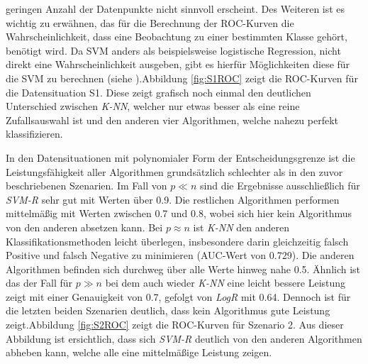 \documentclass[
]{article}
\begin{document}
geringen Anzahl der Datenpunkte nicht sinnvoll erscheint. Des Weiteren
ist es wichtig zu erwähnen, das für die Berechnung der ROC-Kurven die
Wahrscheinlichkeit, dass eine Beobachtung zu einer bestimmten Klasse
gehört, benötigt wird. Da SVM anders als beispielsweise logistische
Regression, nicht direkt eine Wahrscheinlichkeit ausgeben, gibt es
hierfür Möglichkeiten diese für die SVM zu berechnen (siehe
\cite{plattProbabilisticOutputsSupport2000}).\newline Abbildung
\ref{fig:S1ROC} zeigt die ROC-Kurven für die Datensituation S1. Diese
zeigt grafisch noch einmal den deutlichen Unterschied zwischen
\textit{K-NN}, welcher nur etwas besser als eine reine Zufallsauswahl
ist und den anderen vier Algorithmen, welche nahezu perfekt
klassifizieren.

In den Datensituationen mit polynomialer Form der Entscheidungsgrenze
ist die Leistungsfähigkeit aller Algorithmen grundsätzlich schlechter
als in den zuvor beschriebenen Szenarien. Im Fall von \(p \ll n\) sind
die Ergebnisse ausschließlich für \textit{SVM-R} sehr gut mit Werten
über 0.9. Die restlichen Algorithmen performen mittelmäßig mit Werten
zwischen 0.7 und 0.8, wobei sich hier kein Algorithmus von den anderen
absetzen kann. Bei \(p \approx n\) ist \textit{K-NN} den anderen
Klassifikationsmethoden leicht überlegen, insbesondere darin
gleichzeitig falsch Positive und falsch Negative zu minimieren (AUC-Wert
von 0.729). Die anderen Algorithmen befinden sich durchweg über alle
Werte hinweg nahe 0.5. Ähnlich ist das der Fall für \(p \gg n\) bei dem
auch wieder \textit{K-NN} eine leicht bessere Leistung zeigt mit einer
Genauigkeit von 0.7, gefolgt von \textit{LogR} mit 0.64. Dennoch ist für
die letzten beiden Szenarien deutlich, dass kein Algorithmus gute
Leistung zeigt.\newline Abbildung \ref{fig:S2ROC} zeigt die ROC-Kurven
für Szenario 2. Aus dieser Abbildung ist ersichtlich, dass sich
\textit{SVM-R} deutlich von den anderen Algorithmen abheben kann, welche
alle eine mittelmäßige Leistung zeigen.
\end{document}
